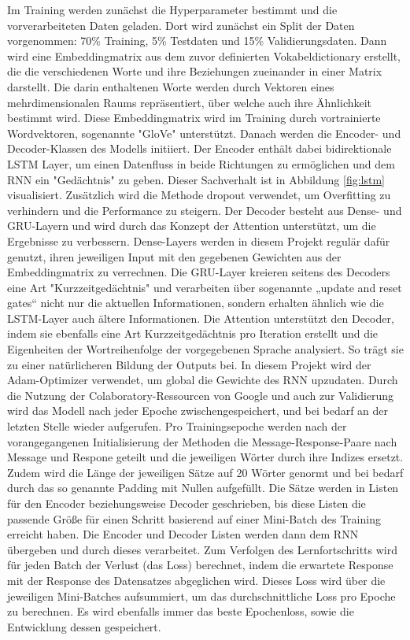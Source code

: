 \documentclass{aa}
\begin{document}
        Im Training werden zunächst die Hyperparameter bestimmt und die vorverarbeiteten Daten geladen. Dort wird zunächst ein Split der Daten vorgenommen: 70\% Training, 5\% Testdaten und 15\% Validierungsdaten. Dann wird eine Embeddingmatrix aus dem zuvor definierten Vokabeldictionary erstellt, die die verschiedenen Worte und ihre Beziehungen zueinander in einer Matrix darstellt. Die darin enthaltenen Worte werden durch Vektoren eines mehrdimensionalen Raums repräsentiert, über welche auch ihre Ähnlichkeit bestimmt wird. Diese Embeddingmatrix wird im Training durch vortrainierte Wordvektoren, sogenannte "GloVe" unterstützt.
        Danach werden die Encoder- und Decoder-Klassen des Modells initiiert. Der Encoder enthält dabei bidirektionale LSTM Layer, um  einen Datenfluss in beide Richtungen zu ermöglichen und dem RNN ein "Gedächtnis" zu geben. Dieser Sachverhalt ist in Abbildung \ref{fig:lstm} visualisiert. Zusätzlich wird die Methode dropout verwendet, um Overfitting zu verhindern und die Performance zu steigern.
        Der Decoder besteht aus Dense- und GRU-Layern und wird durch das Konzept der Attention unterstützt, um die Ergebnisse zu verbessern. Dense-Layers werden in diesem Projekt regulär dafür genutzt, ihren jeweiligen Input mit den gegebenen Gewichten aus der Embeddingmatrix zu verrechnen. Die GRU-Layer kreieren seitens des Decoders eine Art "Kurzzeitgedächtnis" und verarbeiten über sogenannte „update and reset gates“ nicht nur die aktuellen Informationen, sondern erhalten ähnlich wie die LSTM-Layer auch ältere Informationen. Die Attention unterstützt den Decoder, indem sie ebenfalls eine Art Kurzzeitgedächtnis pro Iteration erstellt und die Eigenheiten der Wortreihenfolge der vorgegebenen Sprache analysiert. So trägt sie zu einer natürlicheren Bildung der Outputs bei. 
        In diesem Projekt wird der Adam-Optimizer verwendet, um global die Gewichte des RNN upzudaten.
        Durch die Nutzung der Colaboratory-Ressourcen von Google und auch zur Validierung wird das Modell nach jeder Epoche zwischengespeichert, und bei bedarf an der letzten Stelle wieder aufgerufen.
        Pro Trainingsepoche werden nach der vorangegangenen Initialisierung der Methoden die Message-Response-Paare nach Message und Respone geteilt und die jeweiligen Wörter durch ihre Indizes ersetzt. Zudem wird die Länge der jeweiligen Sätze auf 20 Wörter genormt und bei bedarf durch das so genannte Padding mit Nullen aufgefüllt. Die Sätze werden in Listen für den Encoder beziehungsweise Decoder geschrieben, bis diese Listen die passende Größe für einen Schritt basierend auf einer Mini-Batch des Training erreicht haben. Die Encoder und Decoder Listen werden dann dem RNN übergeben und durch dieses verarbeitet. Zum Verfolgen des Lernfortschritts wird für jeden Batch der Verlust (das Loss) berechnet, indem die erwartete Response mit der Response des Datensatzes abgeglichen wird. Dieses Loss wird über die jeweiligen Mini-Batches aufsummiert, um das durchschnittliche Loss pro Epoche zu berechnen. Es wird ebenfalls immer das beste Epochenloss, sowie die Entwicklung dessen gespeichert. 
\end{document}
